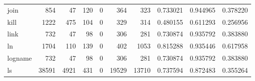 \begin{longtable}{lrrrrrrrrr}
join      &                                                854 &                                                 47 &                                                120 &                                                  0 &                                                364 &                                                323 &                                           0.733021 &                               0.944965 &                             0.378220 \\
kill      &                                               1222 &                                                475 &                                                104 &                                                  0 &                                                329 &                                                314 &                                           0.480155 &                               0.611293 &                             0.256956 \\
link      &                                                732 &                                                 47 &                                                 98 &                                                  0 &                                                306 &                                                281 &                                           0.730874 &                               0.935792 &                             0.383880 \\
ln        &                                               1704 &                                                110 &                                                139 &                                                  0 &                                                402 &                                               1053 &                                           0.815288 &                               0.935446 &                             0.617958 \\
logname   &                                                732 &                                                 47 &                                                 98 &                                                  0 &                                                306 &                                                281 &                                           0.730874 &                               0.935792 &                             0.383880 \\
ls        &                                              38591 &                                               4921 &                                                431 &                                                  0 &                                              19529 &                                              13710 &                                           0.737594 &                               0.872483 &                             0.355264 \\

\end{longtable}

